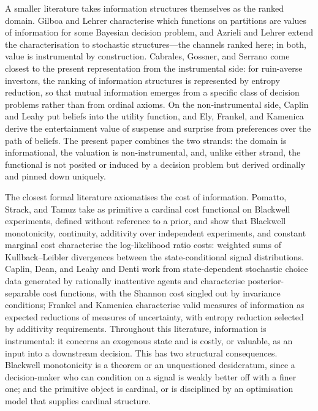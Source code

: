\documentclass[11pt,a4paper]{article}
\theoremstyle{definition}
\newcommand{\1}{\mathbf 1}
\begin{document}
A smaller literature takes information structures themselves as the ranked domain.  Gilboa and Lehrer
\cite{GilboaLehrer1991} characterise which functions on partitions are values of information for some Bayesian decision
problem, and Azrieli and Lehrer \cite{AzrieliLehrer2008} extend the characterisation to stochastic structures---the
channels ranked here; in both, value is instrumental by construction.  Cabrales, Gossner, and Serrano
\cite{CabralesGossnerSerrano2013} come closest to the present representation from the instrumental side: for ruin-averse
investors, the ranking of information structures is represented by entropy reduction, so that mutual information emerges
from a specific class of decision problems rather than from ordinal axioms.  On the non-instrumental side, Caplin and
Leahy \cite{CaplinLeahy2001} put beliefs into the utility function, and Ely, Frankel, and Kamenica
\cite{ElyFrankelKamenica2015} derive the entertainment value of suspense and surprise from preferences over the path of
beliefs.  The present paper combines the two strands: the domain is informational, the valuation is non-instrumental,
and, unlike either strand, the functional is not posited or induced by a decision problem but derived ordinally and
pinned down uniquely.

The closest formal literature axiomatises the cost of information.  Pomatto, Strack, and Tamuz
\cite{PomattoStrackTamuz2023} take as primitive a cardinal cost functional on Blackwell experiments, defined without
reference to a prior, and show that Blackwell monotonicity, continuity, additivity over independent experiments, and
constant marginal cost characterise the log-likelihood ratio costs: weighted sums of Kullback--Leibler divergences
between the state-conditional signal distributions.  Caplin, Dean, and Leahy \cite{CaplinDeanLeahy2022} and Denti
\cite{Denti2022} work from state-dependent stochastic choice data generated by rationally inattentive agents and
characterise posterior-separable cost functions, with the Shannon cost singled out by invariance conditions; Frankel
and Kamenica \cite{FrankelKamenica2019} characterise valid measures of information as expected reductions of measures
of uncertainty, with entropy reduction selected by additivity requirements.  Throughout this literature, information is
instrumental: it concerns an exogenous state and is costly, or valuable, as an input into a downstream decision.  This
has two structural consequences.  Blackwell monotonicity is a theorem or an unquestioned desideratum, since a
decision-maker who can condition on a signal is weakly better off with a finer one; and the primitive object is
cardinal, or is disciplined by an optimisation model that supplies cardinal structure.
\end{document}
